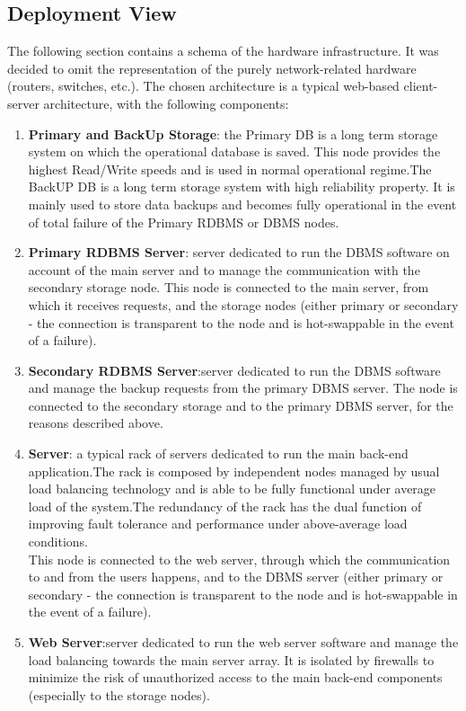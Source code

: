 \subsection{Deployment View}
The following section contains a schema of the hardware infrastructure.
It was decided to omit the representation of the purely network-related hardware (routers, switches, etc.).
The chosen architecture is a typical web-based client-server architecture,
with the following components:
\begin{enumerate}
\item \textbf{Primary and BackUp Storage}: the Primary DB is a long term storage system on which the operational database is saved. This node provides the highest Read/Write speeds and is used in normal operational regime.The BackUP DB is a long term storage system with high reliability property. It is mainly used to store data backups and becomes fully operational in the event of total failure of the Primary RDBMS or DBMS nodes.
\item \textbf{Primary RDBMS Server}: server dedicated to run the DBMS software on account of the main server  and to manage the communication with the secondary storage node. This node is connected to the main server, from which it receives requests, and the storage nodes (either primary or secondary - the connection is transparent to the node and is hot-swappable in the event of a failure).
\item \textbf{Secondary RDBMS Server}:server dedicated to run the DBMS software and
manage the backup requests from the primary DBMS server. The node is connected to the secondary storage and to the primary DBMS server, for the reasons described above.
\item \textbf{Server}: a typical rack of servers dedicated to run the main back-end application.The rack is composed by independent nodes managed by usual
load balancing technology and is able to be fully functional under average load of the system.The redundancy of the rack has the dual function of improving fault tolerance and performance under above-average load conditions.\\
This node is connected to the web server, through which the communication
to and from the users happens, and to the DBMS server (either
primary or secondary - the connection is transparent to the node and is
hot-swappable in the event of a failure).
\item \textbf{Web Server}:server dedicated to run the web server software and manage the load balancing towards the main server array. It is isolated by firewalls to  minimize the risk of unauthorized access to the main back-end components (especially to the storage nodes).
\end{enumerate}

